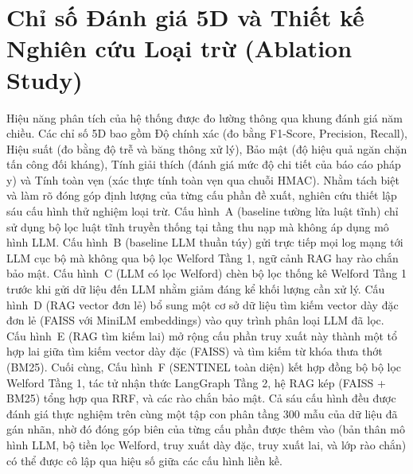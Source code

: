 \section{Chỉ số Đánh giá 5D và Thiết kế Nghiên cứu Loại trừ (Ablation Study)}
Hiệu năng phân tích của hệ thống được đo lường thông qua khung đánh giá năm chiều. Các chỉ số 5D bao gồm Độ chính xác (đo bằng F1-Score, Precision, Recall), Hiệu suất (đo bằng độ trễ và băng thông xử lý), Bảo mật (độ hiệu quả ngăn chặn tấn công đối kháng), Tính giải thích (đánh giá mức độ chi tiết của báo cáo pháp y) và Tính toàn vẹn (xác thực tính toàn vẹn qua chuỗi HMAC). Nhằm tách biệt và làm rõ đóng góp định lượng của từng cấu phần đề xuất, nghiên cứu thiết lập sáu cấu hình thử nghiệm loại trừ. Cấu hình~A (baseline tường lửa luật tĩnh) chỉ sử dụng bộ lọc luật tĩnh truyền thống tại tầng thu nạp mà không áp dụng mô hình LLM. Cấu hình~B (baseline LLM thuần túy) gửi trực tiếp mọi log mạng tới LLM cục bộ mà không qua bộ lọc Welford Tầng 1, ngữ cảnh RAG hay rào chắn bảo mật. Cấu hình~C (LLM có lọc Welford) chèn bộ lọc thống kê Welford Tầng 1 trước khi gửi dữ liệu đến LLM nhằm giảm đáng kể khối lượng cần xử lý. Cấu hình~D (RAG vector đơn lẻ) bổ sung một cơ sở dữ liệu tìm kiếm vector dày đặc đơn lẻ (FAISS với MiniLM embeddings) vào quy trình phân loại LLM đã lọc. Cấu hình~E (RAG tìm kiếm lai) mở rộng cấu phần truy xuất này thành một tổ hợp lai giữa tìm kiếm vector dày đặc (FAISS) và tìm kiếm từ khóa thưa thớt (BM25). Cuối cùng, Cấu hình~F (SENTINEL toàn diện) kết hợp đồng bộ bộ lọc Welford Tầng 1, tác tử nhận thức LangGraph Tầng 2, hệ RAG kép (FAISS + BM25) tổng hợp qua RRF, và các rào chắn bảo mật.
Cả sáu cấu hình đều được đánh giá thực nghiệm trên cùng một tập con phân tầng 300 mẫu của dữ liệu đã gán nhãn, nhờ đó đóng góp biên của từng cấu phần được thêm vào (bản thân mô hình LLM, bộ tiền lọc Welford, truy xuất dày đặc, truy xuất lai, và lớp rào chắn) có thể được cô lập qua hiệu số giữa các cấu hình liền kề.

